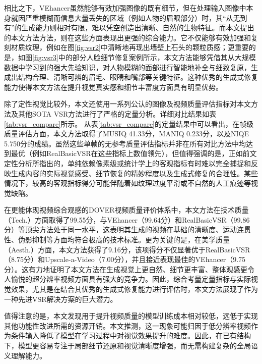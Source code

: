 相比之下，VEhancer\cite{he2024venhancer}虽然能够有效加强图像的既有细节，但在处理输入图像中本身就因严重模糊而信息大量丢失的区域（例如人物的眉眼部分）时，其“从无到有”的生成能力则相对有限，难以凭空创造出清晰、自然的生物特征。而本文提出的本文方法方法，则在这些方面表现出更强的综合能力。它不仅能够有效加强和复刻材质纹理，例如在图\ref{fig:vsr2}中清晰地再现出墙壁上石头的颗粒质感；更重要的是，如图\ref{fig:vsr3}中的部分人脸细节修复案例所示，本文方法能够凭借其从大规模数据中学习到的强大先验知识，对人物模糊的面部进行智能地补全与细致复原，生成出结构合理、清晰可辨的眉毛、眼睛和嘴部等关键特征。这种优秀的生成式修复能力使得本文方法在提升视觉真实感和细节丰富度方面具有明显优势。


除了定性视觉比较外，本文还使用一系列公认的图像及视频质量评估指标对本文方法及其他SOTA VSR方法进行了严格的定量分析。详细对比结果如表\ref{tab:vsr_compare}所示。
从表\ref{tab:vsr_compare}的定量结果中可以看出，在帧级质量评估方面，本文方法取得了MUSIQ 41.33分，MANIQ 0.233分，以及NIQE 5.750分的成绩。虽然这些单帧的无参考质量评估指标并非在所有对比方法中均达到最优（例如RealBasicVSR在这些指标上数值领先），但值得强调的是，正如前文定性分析所指出的，单纯依赖像素级或统计学上的客观指标有时难以完全捕捉和反映生成内容的实际视觉感受、细节恢复的精妙程度以及生成式修复的合理性。某些情况下，较高的客观指标得分可能伴随着如纹理过度平滑或不自然的人工痕迹等视觉缺陷。

在更能体现视频综合观感的DOVER视频质量评价体系中，本文方法在技术质量（Tech.）方面取得了99.55分，与VEhancer（99.64分）和RealBasicVSR（99.86分）等顶尖方法处于同一水平，这表明其生成的视频在基础的清晰度、运动连贯性、伪影抑制等方面均符合极高的技术标准。更为关键的是，在美学质量（Aesth.）方面，本文方法获得了9.16分，该项得分不仅显著优于RealBasicVSR（8.75分）和Upscale-a-Video（7.00分），并且接近表现最佳的VEhancer（9.75分）。这有力地证明了本文方法在生成视觉上更自然、细节更丰富、整体观感更令人愉悦的超分辨率视频方面具有强大的竞争力。因此，综合考量定量指标与实际视觉效果，尤其是在结合其优秀的生成式修复能力进行评估时，本文方法展现了作为一种先进VSR解决方案的巨大潜力。

值得注意的是，本文发现用于提升视频质量的模型训练成本相对较低，远低于实现其他功能性改进所需的资源开销。本文推测，这一现象可能归因于低分辨率视频作为条件输入降低了模型在学习过程中对视觉效果提升的难度。因此，在已有结构下，模型更容易专注于局部细节还原和视觉清晰度增强，而无需构建复杂的全局语义理解能力。\

